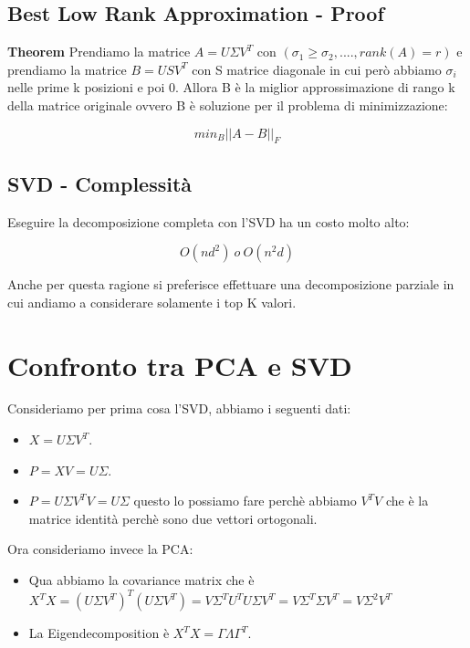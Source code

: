 \documentclass[14pt]{extreport}
\begin{document}
\subsection{Best Low Rank Approximation - Proof}

\textbf{Theorem} 
Prendiamo la matrice $A = U \Sigma V^T$ con $(\sigma_1 \geq \sigma_2, ...., rank(A)=r)$ e prendiamo la matrice $B = USV^{T}$ con S matrice diagonale in cui però abbiamo 
$\sigma_i$ nelle prime k posizioni e poi 0.
Allora B è la miglior approssimazione di rango k della matrice originale ovvero B è soluzione per il problema di minimizzazione:

$$min_B ||A-B||_F$$

\subsection{SVD - Complessità}

Eseguire la decomposizione completa con l'SVD ha un costo molto alto:

$$O(nd^2) \ o \ O(n^{2}d)$$

Anche per questa ragione si preferisce effettuare una decomposizione parziale in cui andiamo a considerare solamente i top K valori.

\section{Confronto tra PCA e SVD}

Consideriamo per prima cosa l'SVD, abbiamo i seguenti dati:

\begin{itemize}
	\item $X = U \Sigma V^T$.
	\item $P = XV = U \Sigma$.
	\item $P = U \Sigma V^T V = U \Sigma$ questo lo possiamo fare perchè abbiamo $V^T V$ che è la matrice identità perchè sono due vettori ortogonali.
\end{itemize}

Ora consideriamo invece la PCA:

\begin{itemize}
	\item Qua abbiamo la covariance matrix che è $X^TX = (U \Sigma V^T)^T(U \Sigma V^T) = V \Sigma^T U^T U \Sigma V^T = V \Sigma^T \Sigma V^T = V \Sigma^2 V^T$ 
	\item La Eigendecomposition è $X^T X = \Gamma \Lambda \Gamma^T$.
\end{itemize} 
\end{document}
